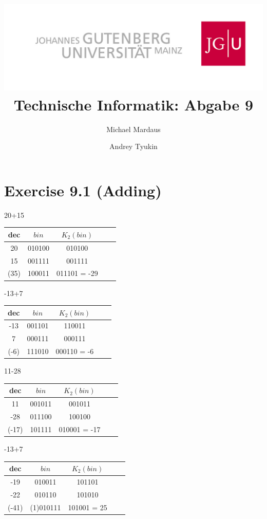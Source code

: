 \documentclass[10pt,a4paper]{scrartcl}
\author{Michael Mardaus \and Andrey Tyukin}
\title{\includegraphics[scale=0.2]{../logo_schriftzug}\\
Technische Informatik: Abgabe 9}
\newcommand{\subExercise}[1]{\vspace{0.5em} \noindent{\bf #1)}}
\begin{document}
\maketitle

\section*{Exercise 9.1 (Adding)}


\subExercise{a}
20+15
\begin{tabular}{|c|c|c|c|c|}
  \hline
dec& $bin$   & $K_2(bin)$  \\\hline
20 & 010100  & 010100 \\          
15 & 001111  & 001111 \\
\hline\hline
(35) & 100011 & 011101 = -29 \\\hline
\end{tabular}

\subExercise{b}
-13+7
\begin{tabular}{|c|c|c|c|c|}
  \hline
dec& $bin$   & $K_2(bin)$  \\\hline
-13 & 001101 & 110011 \\          
7 & 000111   & 000111 \\
\hline\hline
(-6) & 111010 & 000110 = -6 \\\hline
\end{tabular}

\subExercise{c}
11-28
\begin{tabular}{|c|c|c|c|c|}
  \hline
dec& $bin$   & $K_2(bin)$  \\\hline
11 & 001011 & 001011 \\          
-28 & 011100 & 100100 \\
\hline\hline
(-17) & 101111 & 010001 = -17 \\\hline
\end{tabular}

\subExercise{d}
-13+7
\begin{tabular}{|c|c|c|c|c|}
  \hline
dec& $bin$   & $K_2(bin)$  \\\hline
-19 & 010011 & 101101 \\          
-22 & 010110 & 101010 \\
\hline\hline
(-41) & (1)010111 & 101001 = 25 \\\hline
\end{tabular}
\FloatBarrier
\end{document}
